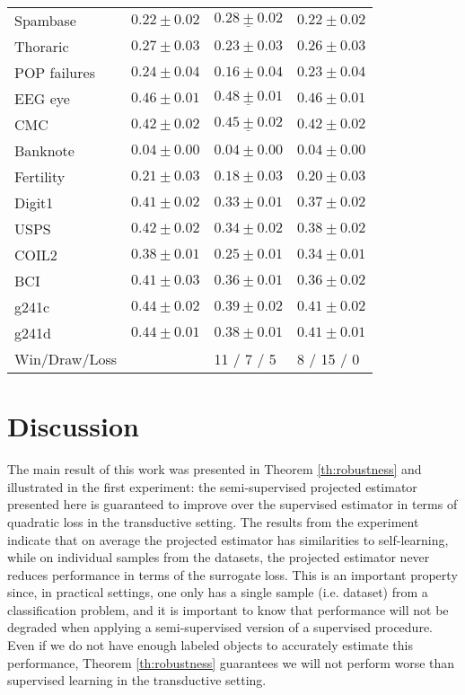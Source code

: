 \documentclass{article}
\begin{document}
\begin{table*}[t]
\begin{tabular}{|l|lll|}
Spambase & $0.22 \pm 0.02$& $\mathbf{\underline{0.28 \pm 0.02}} $& $0.22 \pm 0.02$\\ 
Thoraric & $0.27 \pm 0.03$& $\mathbf{0.23 \pm 0.03} $& $0.26 \pm 0.03$\\ 
POP failures & $0.24 \pm 0.04$& $\mathbf{0.16 \pm 0.04} $& $0.23 \pm 0.04$\\ 
EEG eye & $0.46 \pm 0.01$& $\mathbf{\underline{0.48 \pm 0.01}} $& $0.46 \pm 0.01$\\ 
CMC & $0.42 \pm 0.02$& $\mathbf{\underline{0.45 \pm 0.02}} $& $0.42 \pm 0.02$\\ 
Banknote & $0.04 \pm 0.00$& $0.04 \pm 0.00$& $0.04 \pm 0.00$\\ 
Fertility & $0.21 \pm 0.03$& $\mathbf{0.18 \pm 0.03} $& $0.20 \pm 0.03$\\ 
Digit1 & $0.41 \pm 0.02$& $\mathbf{0.33 \pm 0.01} $& $\mathbf{0.37 \pm 0.02} $\\ 
USPS & $0.42 \pm 0.02$& $\mathbf{0.34 \pm 0.02} $& $\mathbf{0.38 \pm 0.02} $\\ 
COIL2 & $0.38 \pm 0.01$& $\mathbf{0.25 \pm 0.01} $& $\mathbf{0.34 \pm 0.01} $\\ 
BCI & $0.41 \pm 0.03$& $\mathbf{0.36 \pm 0.01} $& $\mathbf{0.36 \pm 0.02} $\\ 
g241c & $0.44 \pm 0.02$& $\mathbf{0.39 \pm 0.02} $& $\mathbf{0.41 \pm 0.02} $\\ 
g241d & $0.44 \pm 0.01$& $\mathbf{0.38 \pm 0.01} $& $\mathbf{0.41 \pm 0.01} $\\
\hline
\hline
Win/Draw/Loss & & 11 / 7 / 5 & 8 / 15 / 0 \\ 
\hline
\end{tabular}


\end{table*}

\section{Discussion}
The main result of this work was presented in Theorem \ref{th:robustness} and illustrated in the first experiment: the semi-supervised projected estimator presented here is guaranteed to improve over the supervised estimator in terms of quadratic loss in the transductive setting. The results from the experiment indicate that on average the projected estimator has similarities to self-learning, while on individual samples from the datasets, the projected estimator never reduces performance in terms of the surrogate loss. This is an important property since, in practical settings, one only has a single sample (i.e. dataset) from a classification problem, and it is important to know that performance will not be degraded when applying a semi-supervised version of a supervised procedure. Even if we do not have enough labeled objects to accurately estimate this performance, Theorem \ref{th:robustness} guarantees we will not perform worse than supervised learning in the transductive setting. 
\end{document}

